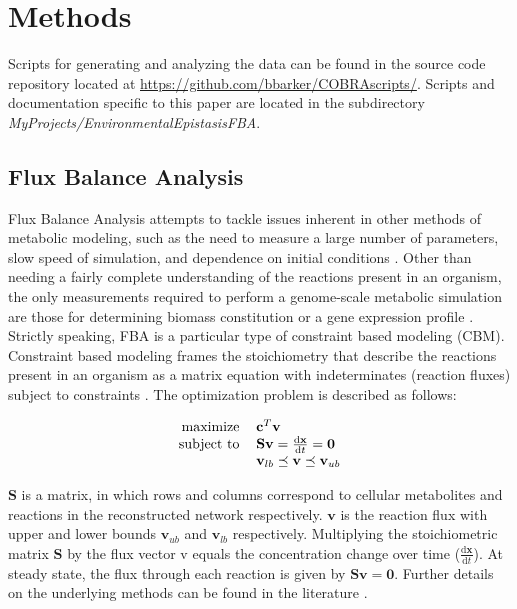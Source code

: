 \documentclass[10pt]{article}
\newcommand\D{\mathrm{d}}
\newcommand{\citep}{\cite}
\begin{document}
\section*{Methods}

Scripts for generating and analyzing the data can be found in the
source code repository located at
\url{https://github.com/bbarker/COBRAscripts/}. Scripts and
documentation specific to this paper are located in the subdirectory
\textit{MyProjects/EnvironmentalEpistasisFBA}.

\subsection*{Flux Balance Analysis}

Flux Balance Analysis attempts to tackle issues inherent in other
methods of metabolic modeling, such as the need to measure a large
number of parameters, slow speed of simulation, and dependence on
initial conditions \citep{Orth2010, Schellenberger2011a}. 
Other than needing a fairly complete
understanding of the reactions present in an organism, the only
measurements required to perform a genome-scale metabolic simulation
are those for determining biomass constitution or a gene expression
profile \citep{Shlomi2005, Mo2009}. Strictly speaking, FBA is a particular type of
constraint based modeling (CBM). Constraint based modeling frames the
stoichiometry that describe the reactions present in an organism as a
matrix equation with indeterminates (reaction fluxes) subject to
constraints \citep{Smallbone2009a, Mo2009}. The optimization problem
is described as follows:


\begin{equation}
\centering
\begin{tabular}{rl}
maximize   & $\mathbf{c}^T\mathbf{v}$                                     \\
subject to & $\mathbf{S v} = \frac{\D{\mathbf{x}}}{\D{t}} = \mathbf{0}$   \\
           & $\mathbf{v}_{lb} \preceq \mathbf{v} \preceq \mathbf{v}_{ub}$ \\
\end{tabular}
\end{equation}

$\mathbf{S}$ is a matrix, in which rows and columns correspond to
cellular metabolites and reactions in the reconstructed network
respectively. $\mathbf{v}$ is the reaction flux with upper and lower
bounds $\mathbf{v}_{ub}$ and $\mathbf{v}_{lb}$
respectively. Multiplying the stoichiometric matrix $\mathbf{S}$ by
the flux vector v equals the concentration change over time
($\frac{\D{\mathbf{x}}}{\D{t}}$). At steady state, the flux through
each reaction is given by $\mathbf{Sv} = \mathbf{0}$. Further details
on the underlying methods can be found in the literature 
\citep{Xu2012, Smallbone2009a, He2010}.
\end{document}
